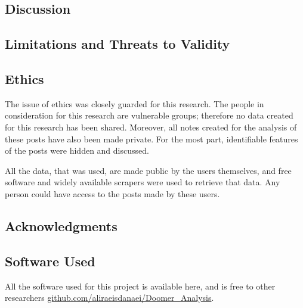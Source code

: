 \documentclass[../report.tex]{subfiles}
\begin{document}
\subsection{Discussion}

\subsection{Limitations and Threats to Validity}

\subsection{Ethics}
The issue of ethics was closely guarded for this research.
The people in consideration for this research are vulnerable groups; therefore no data created for this research has been shared. 
Moreover, all notes created for the analysis of these posts have also been made private. 
For the most part, identifiable features of the posts were hidden and discussed.

All the data, that was used, are made public by the users themselves, and free software and widely available scrapers were used to retrieve that data. 
Any person could have access to the posts made by these users. 

\subsection{Acknowledgments}

\subsection{Software Used}
All the software used for this project is available here, and is free to other researchers 
\url{github.com/aliraeisdanaei/Doomer_Analysis}.
\end{document}
